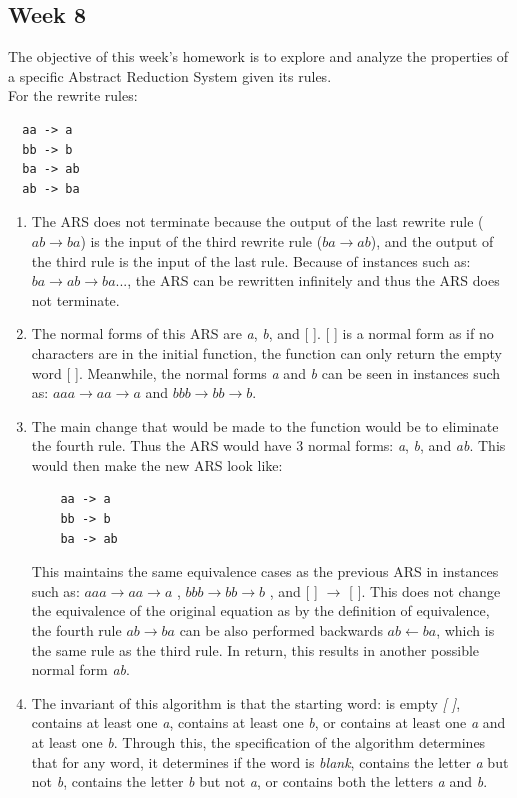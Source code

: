 \documentclass{article}
\theoremstyle{theorem}
\theoremstyle{definition}
\theoremstyle{remark}
\begin{document}
\subsection{Week 8}
The objective of this week's homework is to explore and analyze the properties of a specific Abstract Reduction System given its rules.\\
For the rewrite rules:
\begin{lstlisting}
  aa -> a
  bb -> b
  ba -> ab
  ab -> ba
\end{lstlisting}
\begin{enumerate}
    \item The ARS does not terminate because the output of the last rewrite rule ($ab\xrightarrow{}ba$) is the input of the third rewrite rule ($ba\xrightarrow{}ab$), and the output of the third rule is the input of the last rule. Because of instances such as: $ba \xrightarrow{} ab \xrightarrow{} ba ...$, the ARS can be rewritten infinitely and thus the ARS does not terminate.
    \item The normal forms of this ARS are \textit{a}, \textit{b}, and [ ]. [ ] is a normal form as if no characters are in the initial function, the function can only return the empty word [ ]. Meanwhile, the normal forms \textit{a} and \textit{b} can be seen in instances such as: $aaa \xrightarrow{} aa \xrightarrow{} a$ and $bbb \xrightarrow{}  bb \xrightarrow{} b$.
    \item The main change that would be made to the function would be to eliminate the fourth rule. Thus the ARS would have 3 normal forms: \textit{a}, \textit{b}, and \textit{ab}. This would then make the new ARS look like:
    \begin{lstlisting}
    aa -> a
    bb -> b
    ba -> ab
    \end{lstlisting}

    This maintains the same equivalence cases as the previous ARS in instances such as: $aaa \xrightarrow{} aa \xrightarrow{} a$ , $bbb \xrightarrow{}  bb \xrightarrow{} b$ , and [ ] $\xrightarrow{}$ [ ]. This does not change the equivalence of the original equation as by the definition of equivalence, the fourth rule $ab \xrightarrow{} ba$ can be also performed backwards $ab \xleftarrow{} ba$, which is the same rule as the third rule. In return, this results in another possible normal form \textit{ab}.
    \item The invariant of this algorithm is that the starting word: is empty \textit{[ ]}, contains at least one \textit{a}, contains at least one \textit{b}, or contains at least one \textit{a} and at least one \textit{b}. Through this, the specification of the algorithm determines that for any word, it determines if the word is \textit{blank}, contains the letter \textit{a} but not \textit{b}, contains the letter \textit{b} but not \textit{a}, or contains both the letters \textit{a} and \textit{b}.
\end{enumerate}
\end{document}
